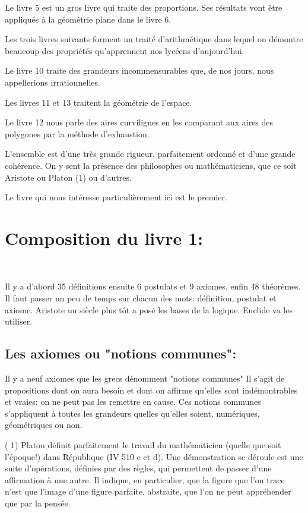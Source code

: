 \documentclass[a4paper, 12pt, twoside]{book}
\begin{document}
   
   Le livre 5 est un gros livre qui traite des proportions. Ses résultats vont être appliqués à la géométrie plane dans le livre 6. \
   
   
  Les trois livres suivants forment un traité d'arithmétique dans lequel on démontre  beaucoup des propriétés qu'apprennent nos lycéens d'aujourd'hui.\
  
  
  Le livre 10 traite des grandeurs incommensurables que, de nos jours, nous appellerions irrationnelles.\
  
  
   Les livres 11 et 13  traitent la géométrie de l'espace.\
   
   
   Le livre 12 nous parle des aires curvilignes en les comparant aux aires des polygones par la méthode d'exhaustion. 
   
    L'ensemble est d'une très grande rigueur,  parfaitement ordonné et d'une grande cohérence. On y sent la présence des philosophes ou mathématiciens, que ce soit Aristote ou Platon (1) ou d'autres.
 
    Le livre qui nous intéresse particulièrement ici est le premier.\\

  \section{Composition du livre 1:}\
  
  
     Il y a d'abord 35 définitions ensuite 6 postulats et 9 axiomes, enfin 48 théorèmes.
    Il faut passer un peu de temps sur chacun des mots: définition, postulat et axiome.
  Aristote un siècle plus tôt  a posé les bases de la logique. Euclide va les utiliser.\\
  
  \subsection{Les axiomes ou "notions communes":}
  

  Il y a neuf axiomes que les grecs dénomment  "notions communes" Il s'agit de propositions dont on aura besoin et dont on affirme qu'elles sont indémontrables et vraies: on ne peut pas les remettre en cause. Ces notions communes s'appliquent à toutes les grandeurs quelles qu'elles soient, numériques, géométriques ou non.\\
  
   
  \begin{footnotesize}
  
  
  ( 1) Platon définit parfaitement le travail du mathématicien (quelle que soit l'époque!) dans République (IV 510 c et d). Une démonstration se déroule est une suite d'opérations, définies par des règles, qui permettent de passer d'une affirmation à une autre. 
   Il indique, en particulier, que la figure que l'on trace n'est que l'image d'une figure parfaite, abstraite, que l'on ne peut appréhender que par la pensée.
  \end{footnotesize}
  
\end{document}
